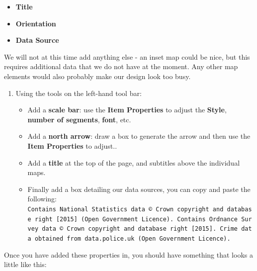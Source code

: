 \documentclass[
]{book}
\providecommand{\tightlist}{%
  \setlength{\itemsep}{0pt}\setlength{\parskip}{0pt}}
\begin{document}
\begin{itemize}
\tightlist
\item
  \textbf{Title}
\item
  \textbf{Orientation}
\item
  \textbf{Data Source}
\end{itemize}

We will not at this time add anything else - an inset map could be nice, but this requires additional data that we do not have at the moment. Any other map elements would also probably make our design look too busy.

\begin{enumerate}
\def\labelenumi{\arabic{enumi}.}
\setcounter{enumi}{8}
\tightlist
\item
  Using the tools on the left-hand tool bar:

  \begin{itemize}
  \tightlist
  \item
    Add a \textbf{scale bar}: use the \textbf{Item Properties} to adjust the \textbf{Style}, \textbf{number of segments}, \textbf{font}, etc.
  \item
    Add a \textbf{north arrow}: draw a box to generate the arrow and then use the \textbf{Item Properties} to adjust..
  \item
    Add a \textbf{title} at the top of the page, and subtitles above the individual maps.
  \item
    Finally add a box detailing our data sources, you can copy and paste the following:
    \texttt{Contains\ National\ Statistics\ data\ ©\ Crown\ copyright\ and\ database\ right\ {[}2015{]}\ (Open\ Government\ Licence).\ Contains\ Ordnance\ Survey\ data\ ©\ Crown\ copyright\ and\ database\ right\ {[}2015{]}.\ Crime\ data\ obtained\ from\ data.police.uk\ (Open\ Government\ Licence).}
  \end{itemize}
\end{enumerate}

Once you have added these properties in, you should have something that looks a little like this:
\end{document}
